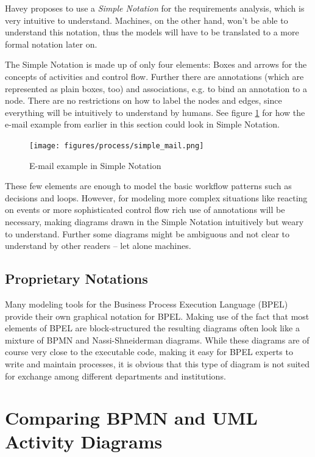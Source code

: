Havey proposes to use a \emph{Simple Notation} for the requirements analysis, which is very intuitive to understand. Machines, on the other hand, won't be able to understand this notation, thus the models will have to be translated to a more formal notation later on.

The Simple Notation is made up of only four elements: Boxes and arrows for the concepts of activities and control flow. Further there are annotations (which are represented as plain boxes, too) and associations, e.g. to bind an annotation to a node. There are no restrictions on how to label the nodes and edges, since everything will be intuitively to understand by humans. See figure \ref{fig:simple-mail} for how the e-mail example from earlier in this section could look in Simple Notation.

\begin{figure}[htp]
	\centering
	\texttt{[image: figures/process/simple\_mail.png]}
	\caption{E-mail example in Simple Notation}
	\label{fig:simple-mail}
\end{figure}

These few elements are enough to model the basic workflow patterns such as decisions and loops. However, for modeling more complex situations like reacting on events or more sophisticated control flow rich use of annotations will be necessary, making diagrams drawn in the Simple Notation intuitively but weary to understand. Further some diagrams might be ambiguous and not clear to understand by other readers -- let alone machines.


\subsection{Proprietary Notations}
Many modeling tools for the Business Process Execution Language (BPEL) provide their own graphical notation for BPEL. Making use of the fact that most elements of BPEL are block-structured the resulting diagrams often look like a mixture of BPMN and Nassi-Shneiderman diagrams. While these diagrams are of course very close to the executable code, making it easy for BPEL experts to write and maintain processes, it is obvious that this type of diagram is not suited for exchange among different departments and institutions.



\section{Comparing BPMN and UML Activity Diagrams}

